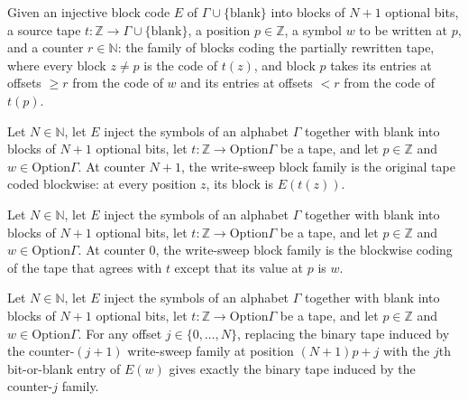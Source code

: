 \begin{definition}
\label{Turing.FinTM.arTail}
\leanok
{}
Given an injective block code $E$ of $\Gamma \cup \{\text{blank}\}$ into blocks of
$N+1$ optional bits, a source tape $t : \mathbb{Z} \to \Gamma \cup \{\text{blank}\}$, a
position $p \in \mathbb{Z}$, a symbol $w$ to be written at $p$, and a counter
$r \in \mathbb{N}$: the family of blocks coding the partially rewritten tape, where
every block $z \neq p$ is the code of $t(z)$, and block $p$ takes its entries at
offsets $\ge r$ from the code of $w$ and its entries at offsets $< r$ from the code of
$t(p)$.
\end{definition}

\begin{lemma}
\label{Turing.FinTM.arTail_full}
\leanok
{}
Let $N\in\mathbb{N}$, let $E$ inject the symbols of an alphabet $\Gamma$ together with
blank into blocks of $N+1$ optional bits, let $t:\mathbb{Z}\to\mathrm{Option}\Gamma$ be a
tape, and let $p\in\mathbb{Z}$ and $w\in\mathrm{Option}\Gamma$. At counter $N+1$, the
write-sweep block family is the original tape coded blockwise: at every position $z$,
its block is $E(t(z))$.
\end{lemma}

\begin{lemma}
\label{Turing.FinTM.arTail_zero}
\leanok
{}
Let $N\in\mathbb{N}$, let $E$ inject the symbols of an alphabet $\Gamma$ together with
blank into blocks of $N+1$ optional bits, let $t:\mathbb{Z}\to\mathrm{Option}\Gamma$ be a
tape, and let $p\in\mathbb{Z}$ and $w\in\mathrm{Option}\Gamma$. At counter $0$, the
write-sweep block family is the blockwise coding of the tape that agrees with $t$ except
that its value at $p$ is $w$.
\end{lemma}

\begin{lemma}
\label{Turing.FinTM.arTail_update}
\leanok
{}
Let $N\in\mathbb{N}$, let $E$ inject the symbols of an alphabet $\Gamma$ together with
blank into blocks of $N+1$ optional bits, let $t:\mathbb{Z}\to\mathrm{Option}\Gamma$ be a
tape, and let $p\in\mathbb{Z}$ and $w\in\mathrm{Option}\Gamma$. For any offset
$j\in\{0,\dots,N\}$, replacing the binary tape induced by the counter-$(j+1)$ write-sweep
family at position $(N+1)p+j$ with the $j$th bit-or-blank entry of $E(w)$ gives exactly
the binary tape induced by the counter-$j$ family.
\end{lemma}

